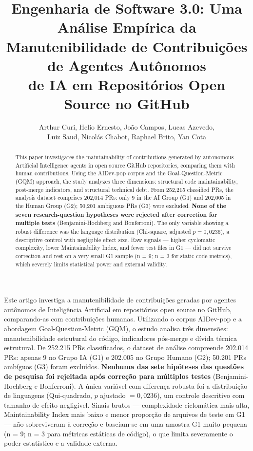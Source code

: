 \documentclass[12pt]{article}
\title{Engenharia de Software 3.0: Uma Análise Empírica da\\
Manutenibilidade de Contribuições de Agentes Autônomos\\
de IA em Repositórios Open Source no GitHub}
\author{Arthur Curi, Helio Ernesto, João Campos, Lucas Azevedo,\\
          Luiz Saud, Nicolás Chabot, Raphael Brito, Yan Cota}
\begin{document}
\maketitle

\begin{abstract}
This paper investigates the maintainability of contributions generated by
autonomous Artificial Intelligence agents in open source GitHub repositories,
comparing them with human contributions. Using the AIDev-pop corpus and the
Goal-Question-Metric (GQM) approach, the study analyzes three dimensions:
structural code maintainability, post-merge indicators, and structural
technical debt. From 252{,}215 classified PRs, the analysis dataset comprises
202{,}014 PRs: only 9 in the AI Group (G1) and 202{,}005 in the Human Group
(G2); 50{,}201 ambiguous PRs (G3) were excluded. \textbf{None of the seven
research-question hypotheses were rejected after correction for multiple
tests} (Benjamini-Hochberg and Bonferroni). The only variable showing a
robust difference was the language distribution (Chi-square, adjusted
$p = 0{,}0236$), a descriptive control with negligible effect size. Raw
signals --- higher cyclomatic complexity, lower Maintainability Index, and
fewer test files in G1 --- did not survive correction and rest on a very small
G1 sample (n = 9; n = 3 for static code metrics), which severely limits
statistical power and external validity.
\end{abstract}

\begin{resumo}
Este artigo investiga a manutenibilidade de contribuições geradas por agentes
autônomos de Inteligência Artificial em repositórios open source no GitHub,
comparando-as com contribuições humanas. Utilizando o corpus AIDev-pop e a
abordagem Goal-Question-Metric (GQM), o estudo analisa três dimensões:
manutenibilidade estrutural do código, indicadores pós-merge e dívida técnica
estrutural. De 252.215 PRs classificados, o dataset de análise compreende
202.014 PRs: apenas 9 no Grupo IA (G1) e 202.005 no Grupo Humano (G2); 50.201
PRs ambíguos (G3) foram excluídos. \textbf{Nenhuma das sete hipóteses das
questões de pesquisa foi rejeitada após correção para múltiplos testes}
(Benjamini-Hochberg e Bonferroni). A única variável com diferença robusta foi
a distribuição de linguagens (Qui-quadrado, $p$ ajustado $= 0{,}0236$), um
controle descritivo com tamanho de efeito negligível. Sinais brutos ---
complexidade ciclomática mais alta, Maintainability Index mais baixo e menor
proporção de arquivos de teste em G1 --- não sobreviveram à correção e
baseiam-se em uma amostra G1 muito pequena (n = 9; n = 3 para métricas
estáticas de código), o que limita severamente o poder estatístico e a
validade externa.
\end{resumo}
\end{document}
